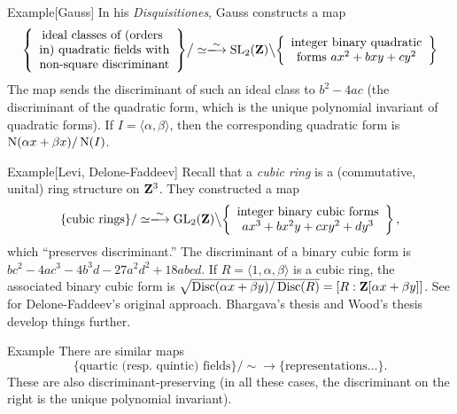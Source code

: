 \begin{enonce}[remark]{Example}[Gauss]
In his \emph{Disquisitiones}, Gauss constructs a map 
\[
  \left\{\begin{array}{c}\text{ideal classes of (orders } \\ \text{in) quadratic fields with} \\ \text{non-square discriminant}\end{array}\right\}\bigr/\simeq 
  \iso 
  \speciallinear_2(\dZ)\bigl\backslash \left\{\begin{array}{c}\text{integer binary quadratic} \\ \text{forms }a x^2+b x y+c y^2\end{array} \right\} 
\]
The map sends the discriminant of such an ideal class to $b^2-4 a c$ (the 
discriminant of the quadratic form, which is the unique polynomial invariant 
of quadratic forms). If $I=\langle \alpha,\beta\rangle$, then 
the corresponding quadratic form is $\operatorname{N}(\alpha x+\beta x)/\operatorname{N}(I)$. 
\end{enonce}

\begin{enonce}[remark]{Example}[Levi, Delone-Faddeev] %
Recall that a \emph{cubic ring} is a (commutative, unital) ring structure 
on $\mathbf{Z}^3$. They constructed a map 
\[
  \{\text{cubic rings}\}/\simeq \iso \generallinear_2(\dZ)\bigl\backslash\left\{\begin{array}{c}\text{integer binary cubic forms} \\ ax^3+b x^2 y+c x y^2+d y^3\end{array}\right\} ,
\]
which ``preserves discriminant.'' The discriminant of a binary cubic form is 
$b c^2-4 a c^3 - 4 b^3 d - 27 a^2 d^2 + 18 a b c d$. If 
$R=\langle 1,\alpha,\beta\rangle$ is a cubic ring, the associated binary cubic 
form is 
$\sqrt{\operatorname{Disc}(\alpha x+\beta y)/\operatorname{Disc}(R)} = [R:\mathbf{Z}[\alpha x+\beta y]]$. 
See \cite{df64} for Delone-Faddeev's original approach. Bhargava's thesis 
\cite{b01} and Wood's thesis \cite{w09} develop things further. 
\end{enonce}

\begin{enonce}[remark]{Example} %
There are similar maps 
\[
  \{\text{quartic (resp.~quintic) fields}\}/\sim \to \{\text{representations\ldots}\} .
\]
These are also discriminant-preserving (in all these cases, the discriminant on 
the right is the unique polynomial invariant). 
\end{enonce}

